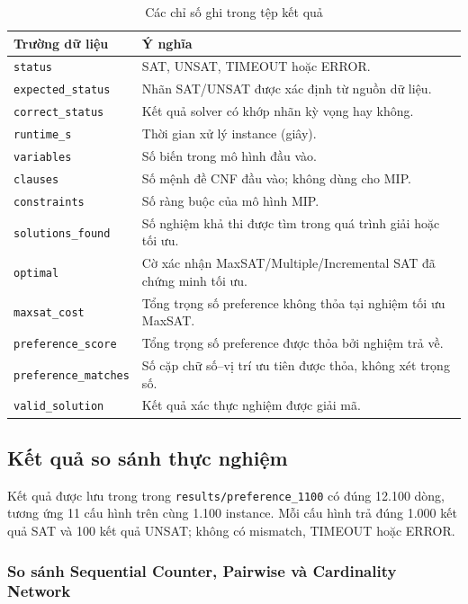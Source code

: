 \documentclass[a4paper,fleqn]{cas-sc}
\begin{document}
\begin{table}[htbp]
\centering
\caption{Các chỉ số ghi trong tệp kết quả}
\label{tab:metrics}
\small
\begin{tabularx}{\linewidth}{@{}lX@{}}
\toprule
Trường dữ liệu & Ý nghĩa\\
\midrule
\texttt{status} & SAT, UNSAT, TIMEOUT hoặc ERROR.\\
\texttt{expected\_status} & Nhãn SAT/UNSAT được xác định từ nguồn dữ liệu.\\
\texttt{correct\_status} & Kết quả solver có khớp nhãn kỳ vọng hay không.\\
\texttt{runtime\_s} & Thời gian xử lý instance (giây).\\
\texttt{variables} & Số biến trong mô hình đầu vào.\\
\texttt{clauses} & Số mệnh đề CNF đầu vào; không dùng cho MIP.\\
\texttt{constraints} & Số ràng buộc của mô hình MIP.\\
\texttt{solutions\_found} & Số nghiệm khả thi được tìm trong quá trình giải hoặc tối ưu.\\
\texttt{optimal} & Cờ xác nhận MaxSAT/Multiple/Incremental SAT đã chứng minh tối ưu.\\
\texttt{maxsat\_cost} & Tổng trọng số preference không thỏa tại nghiệm tối ưu MaxSAT.\\
\texttt{preference\_score} & Tổng trọng số preference được thỏa bởi nghiệm trả về.\\
\texttt{preference\_matches} & Số cặp chữ số--vị trí ưu tiên được thỏa, không xét trọng số.\\
\texttt{valid\_solution} & Kết quả xác thực nghiệm được giải mã.\\
\bottomrule
\end{tabularx}
\end{table}

\subsection{Kết quả so sánh thực nghiệm}\label{sec:results}
Kết quả được lưu trong trong \texttt{results/preference\_1100} có đúng 12.100 dòng, tương ứng 11 cấu hình trên cùng 1.100 instance. Mỗi cấu hình trả đúng 1.000 kết quả SAT và 100 kết quả UNSAT; không có mismatch, TIMEOUT hoặc ERROR.

\subsubsection{So sánh Sequential Counter, Pairwise và Cardinality Network}
\end{document}
